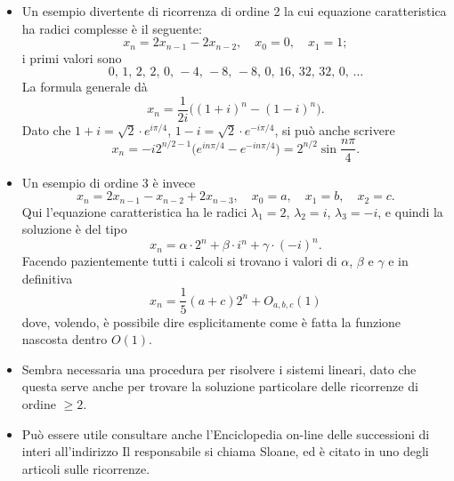 \documentclass{article}[12]
\begin{document}
\def\dx{{\rm d}}
\def\N{\mathbf N}
\def\Z{\mathbf Z}
\def\R{\mathbf R}
\def\C{\mathbf C}
\def\({\bigl(}
\def\){\bigr)}
\def\dsize{\displaystyle}

\bigskip
{}
\bigskip\noindent
\begin{itemize}
\item Un esempio divertente di ricorrenza di ordine 2 la cui equazione
caratteristica ha radici complesse \`e il seguente: 
$$
x_n = 2 x_{n-1} - 2 x_{n-2}, \quad x_0=0, \quad x_1=1;
$$
i primi valori sono 
$$
0,\, 1,\, 2,\, 2,\, 0,\, -4,\, -8,\, -8,\, 0,\, 16,\, 32,\, 32,\, 0,\,
\dots
$$
La formula generale d\`a 
$$
x_n = \frac1 {2i} \( (1+i)^n - (1-i)^n \).
$$
Dato che $1+i=\sqrt2 \cdot e^{i\pi/4}$, $1-i=\sqrt2 \cdot e^{-i\pi/4}$, si pu\`o anche scrivere 
$$
x_n = -i2^{n/2-1} \( e^{in\pi/4} - e^{-in\pi/4}\)
    = 2^{n/2} \sin\frac{n\pi}4.
$$
\item Un esempio di ordine 3 \`e invece 
$$
x_n = 2 x_{n-1} - x_{n-2} + 2 x_{n-3},\quad x_0=a,\quad x_1=b,\quad
x_2=c.
$$
Qui l'equazione caratteristica ha le radici $\lambda_1=2$, $\lambda_2=i$, $\lambda_3=-i$, 
e quindi la soluzione \`e del tipo 
$$
x_n = \alpha \cdot 2^n + \beta \cdot i^n + \gamma\cdot(-i)^n.
$$
Facendo pazientemente tutti i calcoli si trovano i valori di $\alpha$, $\beta$ e $\gamma$ e in 
definitiva 
$$
x_n = \frac15 (a+c) 2^n + O_{a,b,c}(1)
$$
dove, volendo, \`e possibile dire esplicitamente come \`e fatta la
funzione nascosta dentro $O(1)$. 
\item Sembra necessaria una procedura per risolvere i sistemi lineari, dato che questa serve 
anche per trovare la soluzione particolare delle ricorrenze di ordine $\ge2$. 
\item Pu\`o essere utile consultare anche l'Enciclopedia on-line delle
successioni di interi all'indirizzo 
Il responsabile si chiama Sloane, ed \`e citato in uno degli articoli sulle ricorrenze. 


\end{itemize}
\end{document}
